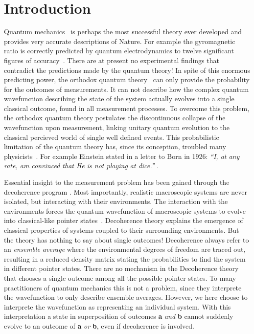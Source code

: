 \documentclass[showpacs,preprintnumbers,amsmath,amssymb,12pt]{revtex4-2}
\begin{document}
\newcommand{\eq}{\! = \!}
\newcommand{\keq}{\!\! = \!\!}
\newcommand{\kadd}{\! + \!}

\newpage
\section{Introduction}
Quantum mechanics~\cite{Bohr,Dirac,neumann} is perhaps the most
successful theory ever developed and provides very accurate
descriptions of Nature. For example the gyromagnetic ratio is
correctly predicted by quantum electrodynamics to twelve significant
figures of accuracy~\cite{QED}. There are at present no experimental
findings that contradict the predictions made by the quantum theory!
In spite of this enormous predicting power, the orthodox quantum
theory~\cite{Bohr,Dirac,neumann} can only provide the probability for
the outcomes of measurements. It can not describe how the complex
quantum wavefunction describing the state of the system actually
evolves into a single classical outcome, found in all measurement
processes. To overcome this problem, the orthodox quantum theory
postulates the discontinuous collapse of the wavefunction upon
measurement, linking unitary quantum evolution to the classical
percieved world of single well defined events. This probabilistic
limitation of the quantum theory has, since its conception, troubled
many physicists~\cite{bohr35nat,whitaker,scrod35,einsteinwir,everett,
  bohm52,bohmnature,grw86,hooftwitten}. For example Einstein stated in
a letter to Born in 1926: \emph{``I, at any rate, am convinced that
  {\em He} is not playing at dice.''} \cite{einsteinborn2}.
       
Essential insight to the measurement problem has been gained through
the decoherence program \cite{zurek03,schlosshauer,jooszeh}. Most
importantly, realistic macroscopic systems are never isolated, but
interacting with their environments. The interaction with the
environments forces the quantum wavefunction of macroscopic systems to
evolve into classical-like pointer
states~\cite{zurek03,schlosshauer,jooszeh}. Decoherence theory
explains the emergence of classical properties of systems coupled to
their surrounding environments. But the theory has nothing to say
about single outcomes!  Decoherence always refer to an {\em ensemble
  average} where the environmental degrees of freedom are traced out,
resulting in a reduced density matrix stating the probabilities to
find the system in different pointer states. There are no mechanism in
the Decoherence theory that chooses a single outcome among all the
possible pointer states. To many practitioners of quantum mechanics
this is not a problem, since they interprete the wavefunction to only
describe ensemble averages.  However, we here choose to interprete the
wavefunction as representing an individual system. With this
interpretation a state in superposition of outcomes {\bf a} {\em
  and\/} {\bf b\/} cannot suddenly evolve to an outcome of {\bf a}
{\em or\/} {\bf b}, even if decoherence is involved.
\end{document}
